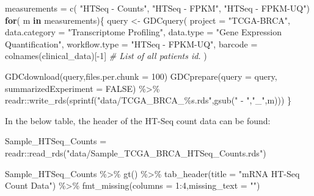 \documentclass[
]{book}
\newenvironment{Shaded}{\begin{snugshade}}{\end{snugshade}}
\newcommand{\AttributeTok}[1]{\textcolor[rgb]{0.77,0.63,0.00}{#1}}
\newcommand{\CommentTok}[1]{\textcolor[rgb]{0.56,0.35,0.01}{\textit{#1}}}
\newcommand{\ConstantTok}[1]{\textcolor[rgb]{0.00,0.00,0.00}{#1}}
\newcommand{\ControlFlowTok}[1]{\textcolor[rgb]{0.13,0.29,0.53}{\textbf{#1}}}
\newcommand{\DecValTok}[1]{\textcolor[rgb]{0.00,0.00,0.81}{#1}}
\newcommand{\FunctionTok}[1]{\textcolor[rgb]{0.00,0.00,0.00}{#1}}
\newcommand{\NormalTok}[1]{#1}
\newcommand{\OtherTok}[1]{\textcolor[rgb]{0.56,0.35,0.01}{#1}}
\newcommand{\SpecialCharTok}[1]{\textcolor[rgb]{0.00,0.00,0.00}{#1}}
\newcommand{\StringTok}[1]{\textcolor[rgb]{0.31,0.60,0.02}{#1}}
\begin{document}
\begin{Shaded}
\begin{Highlighting}[]

\NormalTok{measurements }\OtherTok{=} \FunctionTok{c}\NormalTok{( }\StringTok{"HTSeq {-} Counts"}\NormalTok{, }\StringTok{"HTSeq {-} FPKM"}\NormalTok{, }\StringTok{"HTSeq {-} FPKM{-}UQ"}\NormalTok{)}
\ControlFlowTok{for}\NormalTok{( m }\ControlFlowTok{in}\NormalTok{ measurements)\{}
\NormalTok{  query }\OtherTok{\textless{}{-}} \FunctionTok{GDCquery}\NormalTok{(}
    \AttributeTok{project =} \StringTok{"TCGA{-}BRCA"}\NormalTok{, }
    \AttributeTok{data.category =} \StringTok{"Transcriptome Profiling"}\NormalTok{, }
    \AttributeTok{data.type =} \StringTok{"Gene Expression Quantification"}\NormalTok{, }
    \AttributeTok{workflow.type =} \StringTok{"HTSeq {-} FPKM{-}UQ"}\NormalTok{,}
    \AttributeTok{barcode =}  \FunctionTok{colnames}\NormalTok{(clinical\_data)[}\SpecialCharTok{{-}}\DecValTok{1}\NormalTok{] }\CommentTok{\# List of all patients id.}
\NormalTok{  )}
  
  \FunctionTok{GDCdownload}\NormalTok{(query,}\AttributeTok{files.per.chunk =} \DecValTok{100}\NormalTok{)}
   \FunctionTok{GDCprepare}\NormalTok{(}\AttributeTok{query =}\NormalTok{ query, }\AttributeTok{summarizedExperiment =} \ConstantTok{FALSE}\NormalTok{) }\SpecialCharTok{\%\textgreater{}\%} 
\NormalTok{  readr}\SpecialCharTok{::}\FunctionTok{write\_rds}\NormalTok{(}\FunctionTok{sprintf}\NormalTok{(}\StringTok{"data/TCGA\_BRCA\_\%s.rds"}\NormalTok{,}\FunctionTok{gsub}\NormalTok{(}\StringTok{" {-} "}\NormalTok{,}\StringTok{"\_"}\NormalTok{,m)))}
\NormalTok{\}}
\end{Highlighting}
\end{Shaded}

In the below table, the header of the HT-Seq count data can be found:

\begin{Shaded}
\begin{Highlighting}[]
\NormalTok{Sample\_HTSeq\_Counts }\OtherTok{=}\NormalTok{ readr}\SpecialCharTok{::}\FunctionTok{read\_rds}\NormalTok{(}\StringTok{"data/Sample\_TCGA\_BRCA\_HTSeq\_Counts.rds"}\NormalTok{) }

\NormalTok{Sample\_HTSeq\_Counts }\SpecialCharTok{\%\textgreater{}\%}
  \FunctionTok{gt}\NormalTok{() }\SpecialCharTok{\%\textgreater{}\%} 
  \FunctionTok{tab\_header}\NormalTok{(}\AttributeTok{title =} \StringTok{"mRNA HT{-}Seq Count Data"}\NormalTok{) }\SpecialCharTok{\%\textgreater{}\%} 
   \FunctionTok{fmt\_missing}\NormalTok{(}\AttributeTok{columns =} \DecValTok{1}\SpecialCharTok{:}\DecValTok{4}\NormalTok{,}\AttributeTok{missing\_text =} \StringTok{""}\NormalTok{)}
\end{Highlighting}
\end{Shaded}
\end{document}
